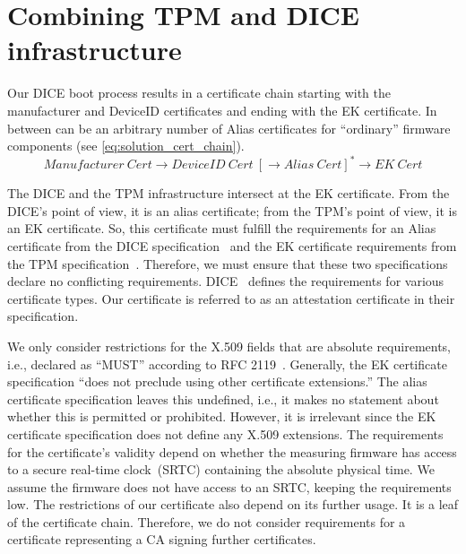 



\section{Combining TPM and DICE infrastructure}

Our DICE boot process results in a certificate chain starting with the manufacturer and DeviceID certificates and ending with the EK certificate.
In between can be an arbitrary number of Alias certificates for ``ordinary'' firmware components (see \autoref{eq:solution_cert_chain}).
\begin{equation}
\label{eq:solution_cert_chain}
Manufacturer\ Cert \rightarrow DeviceID\ Cert\ [\rightarrow Alias\ Cert]^* \rightarrow EK\ Cert
\end{equation}


The DICE and the TPM infrastructure intersect at the \ac{EK} certificate.
From the DICE's point of view, it is an alias certificate; from the TPM's point of view, it is an \ac{EK} certificate.
So, this certificate must fulfill the requirements for an Alias certificate from the DICE specification~\cite{DICE_certs} and the EK certificate requirements from the TPM specification~\cite{tcg-ek}.
Therefore, we must ensure that these two specifications declare no conflicting requirements.
DICE~\cite{DICE_certs} defines the requirements for various certificate types.
Our certificate is referred to as an attestation certificate in their specification.

We only consider restrictions for the X.509 fields that are absolute requirements, i.e., declared as ``MUST'' according to RFC 2119~\cite{Bradner1997}.
Generally, the EK certificate specification ``does not preclude using other certificate extensions.''
The alias certificate specification leaves this undefined, i.e., it makes no statement about whether this is permitted or prohibited.
However, it is irrelevant since the EK certificate specification does not define any X.509 extensions.
The requirements for the certificate's validity depend on whether the measuring firmware has access to a secure real-time clock~(SRTC) containing the absolute physical time.
We assume the firmware does not have access to an SRTC, keeping the requirements low.
The restrictions of our certificate also depend on its further usage.
It is a leaf of the certificate chain.
Therefore, we do not consider requirements for a certificate representing a \ac{CA} signing further certificates.

